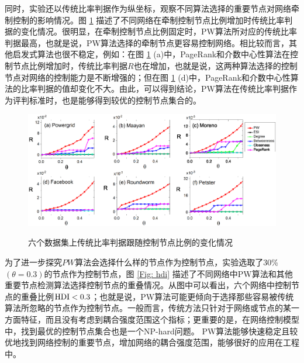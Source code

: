 同时，实验还以传统比率判据作为纵坐标，观察不同算法选择的重要节点对网络牵制控制的影响情况。图 \ref{Fig: R} 描述了不同网络在牵制控制节点比例增加时传统比率判据的变化情况。很明显，在牵制控制节点比例固定时，PW算法所对应的传统比率判据最高，也就是说，PW算法选择的牵制节点更容易控制网络。相比较而言，其他启发式算法也很不稳定，例如：在图 \ref{Fig: R} (a)中，PageRank和介数中心性算法在控制节点比例增加时，传统比率判据$ R $也在增加，也就是说，这两种算法选择的控制节点对网络的控制能力是不断增强的；但在图 \ref{Fig: R} (d)中，PageRank和介数中心性算法的比率判据的值却变化不大。由此，可以得到结论，PW算法在传统比率判据作为评判标准时，也是能够得到较优的控制节点集合的。

\begin{figure}[ht]%
	\centering
	\includegraphics[width=0.9\columnwidth]{chapter4Fig/R.eps}\\
	\caption{六个数据集上传统比率判据跟随控制节点比例的变化情况}
	\label{Fig: R}	
\end{figure}

为了进一步探究$ PW $算法会选择什么样的节点作为控制节点，实验选取了30\% $ (\theta=0.3) $的节点作为控制节点，图 \ref{Fig: hdi} 描述了不同网络中PW算法和其他重要节点检测算法选择控制节点的重叠情况。从图中可以看出，六个网络中控制节点的重叠比例$ {\rm HDI}<0.3 $；也就是说，PW算法可能更倾向于选择那些容易被传统算法所忽略的节点作为控制节点。一般而言，传统方法只针对于网络或节点的某一方面特征，而且没有考虑到耦合强度范围这个指标；更重要的是，在网络控制模型中，找到最优的控制节点集合也是一个NP-hard问题。
PW算法能够快速稳定且较优地找到网络控制的重要节点，增加网络的耦合强度范围，能够很好的应用在工程中。

